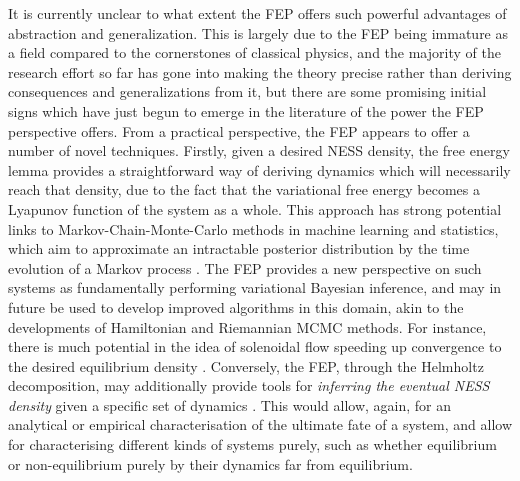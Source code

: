 It is currently unclear to what extent the FEP offers such powerful advantages of abstraction and generalization. This is largely due to the FEP being immature as a field compared to the cornerstones of classical physics, and the majority of the research effort so far has gone into making the theory precise rather than deriving consequences and generalizations from it, but there are some promising initial signs which have just begun to emerge in the literature of the power the FEP perspective offers. From a practical perspective, the FEP appears to offer a number of novel techniques. Firstly, given a desired NESS density, the free energy lemma provides a straightforward way of deriving dynamics which will necessarily reach that density, due to the fact that the variational free energy becomes a Lyapunov function of the system as a whole. This approach has strong potential links to Markov-Chain-Monte-Carlo methods in machine learning and statistics, which aim to approximate an intractable posterior distribution by the time evolution of a Markov process \citep{metropolis1953equation,neal2011mcmc,betancourt2017conceptual,chen2014stochastic,brooks2011handbook}. The FEP provides a new perspective on such systems as fundamentally performing variational Bayesian inference, and may in future be used to develop improved algorithms in this domain, akin to the developments of Hamiltonian \citep{betancourt2013generalizing} and Riemannian MCMC \citep{girolami2011riemann} methods. For instance, there is much potential in the idea of solenoidal flow speeding up convergence to the desired equilibrium density \citep{ma2015complete}. Conversely, the FEP, through the Helmholtz decomposition, may additionally provide tools for \emph{inferring the eventual NESS density} given a specific set of dynamics \citep{ma2015complete,friston2019particularphysics}. This would allow, again, for an analytical or empirical characterisation of the ultimate fate of a system, and allow for characterising different kinds of systems purely, such as whether equilibrium or non-equilibrium purely by their dynamics far from equilibrium. 

